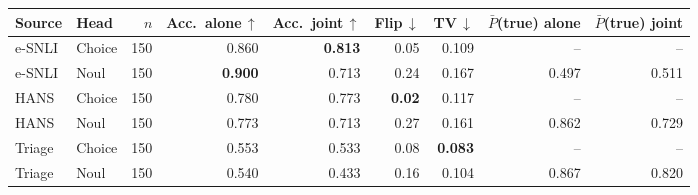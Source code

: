 \begin{tabular}{llrrrrrrr}
\toprule
Source & Head & $n$ & Acc.\ alone\,$\uparrow$ & Acc.\ joint\,$\uparrow$ & Flip\,$\downarrow$ & TV\,$\downarrow$ & $\bar{P}$(true) alone & $\bar{P}$(true) joint \\
\midrule
e-SNLI & Choice & 150 & 0.860 & \textbf{0.813} & 0.05 & 0.109 & -- & -- \\
e-SNLI & Noul & 150 & \textbf{0.900} & 0.713 & 0.24 & 0.167 & 0.497 & 0.511 \\
HANS & Choice & 150 & 0.780 & 0.773 & \textbf{0.02} & 0.117 & -- & -- \\
HANS & Noul & 150 & 0.773 & 0.713 & 0.27 & 0.161 & 0.862 & 0.729 \\
Triage & Choice & 150 & 0.553 & 0.533 & 0.08 & \textbf{0.083} & -- & -- \\
Triage & Noul & 150 & 0.540 & 0.433 & 0.16 & 0.104 & 0.867 & 0.820 \\
\bottomrule
\end{tabular}
